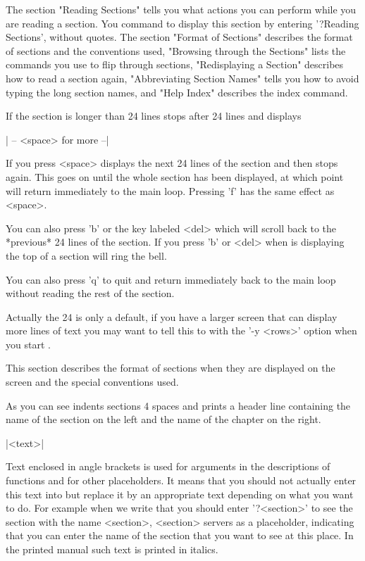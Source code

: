 The section "Reading  Sections"  tells  you what actions  you can perform
while  you are reading  a  section.   You  command {\GAP} to display this
section  by  entering '?Reading Sections', without quotes.   The  section
"Format of Sections" describes the format of sections and the conventions
used, "Browsing through the  Sections" lists the commands you use to flip
through  sections, "Redisplaying  a  Section" describes  how  to  read  a
section again, "Abbreviating Section Names" tells you how to avoid typing
the long section names, and "Help Index" describes the index command.

%

If the  section is longer than 24  lines {\GAP} stops  after 24 lines and
displays

|    -- <space> for more --|

If you press <space> {\GAP} displays the next 24 lines of the section and
then stops again.   This  goes on   until  the whole   section  has  been
displayed, at which  point {\GAP}  will  return immediately to  the  main
{\GAP} loop.  Pressing 'f' has the same effect as <space>.

You can also press 'b' or the key labeled <del> which will scroll back to
the *previous* 24 lines of  the section.  If  you press 'b' or <del> when
{\GAP} is displaying the top of a section {\GAP} will ring the bell.

You can  also press 'q'  to quit and  return immediately back to the main
{\GAP} loop without reading the rest of the section.

Actually the 24 is only a default,  if you have a larger screen  that can
display more lines of text you  may want to tell this to {\GAP} with  the
'-y <rows>' option when you start {\GAP}.

%

This section describes the format of sections when they are displayed  on
the screen and the special conventions used.

As you can see {\GAP} indents sections 4 spaces and  prints a header line
containing  the  name of the  section  on the  left and  the  name of the
chapter on the right.

|<text>|

Text enclosed in angle brackets is used for arguments in the descriptions
of  functions and for other placeholders.   It  means that you should not
actually  enter this text into  {\GAP} but replace   it by an appropriate
text depending on what you  want to do.   For example when we write  that
you should enter '?<section>' to see the section with the name <section>,
<section> servers as  a placeholder, indicating  that  you can enter  the
name of the section that you want to  see at this  place.  In the printed
manual such text is printed in italics.

